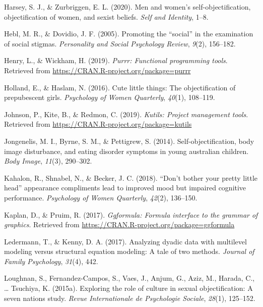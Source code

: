 \documentclass[man]{apa6}
\begin{document}
\hypertarget{ref-harsey2020men}{}
Harsey, S. J., \& Zurbriggen, E. L. (2020). Men and women's
self-objectification, objectification of women, and sexist beliefs.
\emph{Self and Identity}, 1--8.

\hypertarget{ref-hebl2005promoting}{}
Hebl, M. R., \& Dovidio, J. F. (2005). Promoting the ``social'' in the
examination of social stigmas. \emph{Personality and Social Psychology
Review}, \emph{9}(2), 156--182.

\hypertarget{ref-R-purrr}{}
Henry, L., \& Wickham, H. (2019). \emph{Purrr: Functional programming
tools}. Retrieved from \url{https://CRAN.R-project.org/package=purrr}

\hypertarget{ref-holland2016}{}
Holland, E., \& Haslam, N. (2016). Cute little things: The
objectification of prepubescent girls. \emph{Psychology of Women
Quarterly}, \emph{40}(1), 108--119.

\hypertarget{ref-R-kutils}{}
Johnson, P., Kite, B., \& Redmon, C. (2019). \emph{Kutils: Project
management tools}. Retrieved from
\url{https://CRAN.R-project.org/package=kutils}

\hypertarget{ref-jongenelis2014}{}
Jongenelis, M. I., Byrne, S. M., \& Pettigrew, S. (2014).
Self-objectification, body image disturbance, and eating disorder
symptoms in young australian children. \emph{Body Image}, \emph{11}(3),
290--302.

\hypertarget{ref-kahalon2018don}{}
Kahalon, R., Shnabel, N., \& Becker, J. C. (2018). ``Don't bother your
pretty little head'' appearance compliments lead to improved mood but
impaired cognitive performance. \emph{Psychology of Women Quarterly},
\emph{42}(2), 136--150.

\hypertarget{ref-R-ggformula}{}
Kaplan, D., \& Pruim, R. (2017). \emph{Ggformula: Formula interface to
the grammar of graphics}. Retrieved from
\url{https://CRAN.R-project.org/package=ggformula}

\hypertarget{ref-ledermann2017analyzing}{}
Ledermann, T., \& Kenny, D. A. (2017). Analyzing dyadic data with
multilevel modeling versus structural equation modeling: A tale of two
methods. \emph{Journal of Family Psychology}, \emph{31}(4), 442.

\hypertarget{ref-loughnan2015exploring}{}
Loughnan, S., Fernandez-Campos, S., Vaes, J., Anjum, G., Aziz, M.,
Harada, C., \ldots{} Tsuchiya, K. (2015a). Exploring the role of culture
in sexual objectification: A seven nations study. \emph{Revue
Internationale de Psychologie Sociale}, \emph{28}(1), 125--152.
\end{document}

